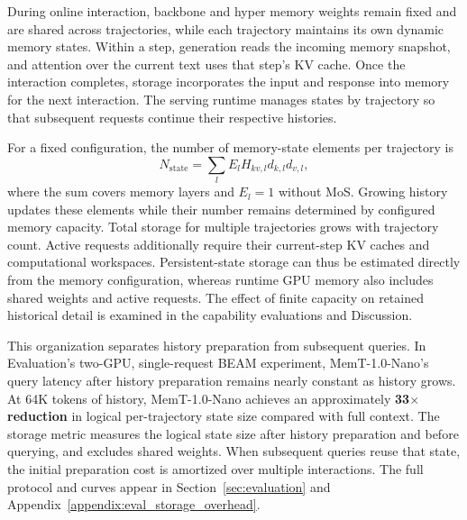 During online interaction, backbone and hyper memory weights remain fixed and are shared across trajectories, while each trajectory maintains its own dynamic memory states.
Within a step, generation reads the incoming memory snapshot, and attention over the current text uses that step's KV cache.
Once the interaction completes, storage incorporates the input and response into memory for the next interaction.
The serving runtime manages states by trajectory so that subsequent requests continue their respective histories.

For a fixed configuration, the number of memory-state elements per trajectory is
\begin{equation*}
N_{\mathrm{state}}=\sum_l E_l H_{kv,l}d_{k,l}d_{v,l},
\end{equation*}
where the sum covers memory layers and $E_l=1$ without MoS.
Growing history updates these elements while their number remains determined by configured memory capacity.
Total storage for multiple trajectories grows with trajectory count.
Active requests additionally require their current-step KV caches and computational workspaces.
Persistent-state storage can thus be estimated directly from the memory configuration, whereas runtime GPU memory also includes shared weights and active requests.
The effect of finite capacity on retained historical detail is examined in the capability evaluations and Discussion.

This organization separates history preparation from subsequent queries.
In Evaluation's two-GPU, single-request BEAM experiment, MemT-1.0-Nano's query latency after history preparation remains nearly constant as history grows.
At 64K tokens of history, MemT-1.0-Nano achieves an approximately \textbf{33$\times$ reduction} in logical per-trajectory state size compared with full context.
The storage metric measures the logical state size after history preparation and before querying, and excludes shared weights.
When subsequent queries reuse that state, the initial preparation cost is amortized over multiple interactions.
The full protocol and curves appear in Section~\ref{sec:evaluation} and Appendix~\ref{appendix:eval_storage_overhead}.
